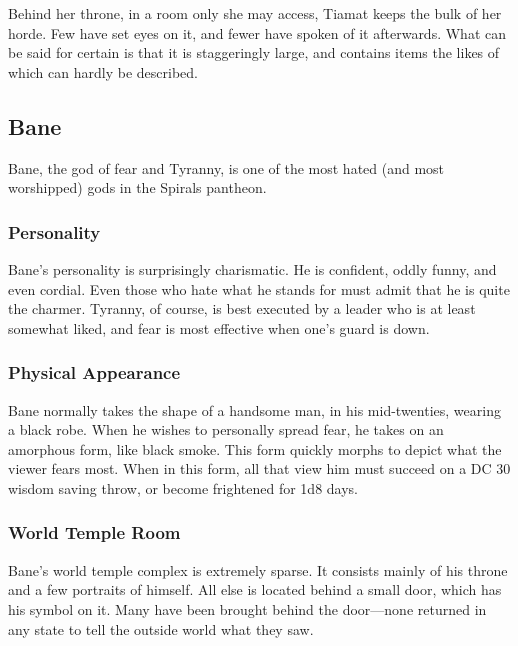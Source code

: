 Behind her throne, in a room only she may access, Tiamat keeps the bulk of her horde.
Few have set eyes on it, and fewer have spoken of it afterwards.
What can be said for certain is that it is staggeringly large, and contains items the likes of which can hardly be described.

\subsection*{Bane}
\begin{goddesc}
\end{goddesc}
Bane, the god of fear and Tyranny, is one of the most hated (and most worshipped) gods in the Spirals pantheon.

\subsubsection*{Personality}
Bane's personality is surprisingly charismatic.
He is confident, oddly funny, and even cordial.
Even those who hate what he stands for must admit that he is quite the charmer.
Tyranny, of course, is best executed by a leader who is at least somewhat liked, and fear is most effective when one's guard is down.

\subsubsection*{Physical Appearance}
Bane normally takes the shape of a handsome man, in his mid-twenties, wearing a black robe.
When he wishes to personally spread fear, he takes on an amorphous form, like black smoke.
This form quickly morphs to depict what the viewer fears most.
When in this form, all that view him must succeed on a DC 30 wisdom saving throw, or become frightened for 1d8 days.

\subsubsection*{World Temple Room}
Bane's world temple complex is extremely sparse.
It consists mainly of his throne and a few portraits of himself.
All else is located behind a small door, which has his symbol on it.
Many have been brought behind the door---none returned in any state to tell the outside world what they saw.